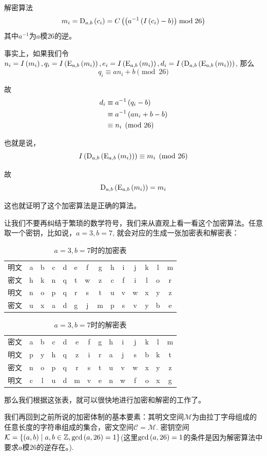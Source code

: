 解密算法
\[m_i={\mathrm{D}_{a, b}\left({c_i}\right)}=C\left( {\left( {a^{-1}\left( {I\left( {c_i}\right)-b}\right)}\right)\bmod{26}}\right)\]
其中$a^{-1}$为$a$模$26$的逆。\par
事实上，如果我们令$n_i=I\left( {m_i}\right), q_i=I\left( {{\mathrm{E}_{a, b}\left({m_i}\right)}}\right), e_i=I\left( {{\mathrm{E}_{a, b}\left({m_i}\right)}}\right), d_i=I\left( {{\mathrm{D}_{a, b}\left({{\mathrm{E}_{a, b}\left({m_i}\right)}}\right)}}\right)$, 那么
\[q_i\equiv an_i+b\pmod{26}\]

故
\begin{align*}
    d_i&\equiv a^{-1}\left( {q_i-b}\right)\\
    &\equiv a^{-1}\left( {an_i+b-b}\right)\\
    &\equiv n_i\pmod{26}
\end{align*}

也就是说，
\[I\left( {{\mathrm{D}_{a, b}\left({{\mathrm{E}_{a, b}\left({m_i}\right)}}\right)}}\right)\equiv m_i\pmod{26}\]

故
\[{\mathrm{D}_{a, b}\left({{\mathrm{E}_{a, b}\left({m_i}\right)}}\right)}=m_i\]

这也就证明了这个加密算法是正确的算法。\par
让我们不要再纠结于繁琐的数学符号，我们来从直观上看一看这个加密算法。任意取一个密钥，比如说，$a=3, b=7$, 就会对应的生成一张加密表和解密表：
\begin{table}[H]
    \centering
    \caption{$a=3, b=7$时的加密表}
    \begin{tabular}{c|c|c|c|c|c|c|c|c|c|c|c|c|c}\hline
        明文&a&b&c&d&e&f&g&h&i&j&k&l&m\\
        密文&h&k&n&q&t&w&z&c&f&i&l&o&r\\\hline
        明文&n&o&p&q&r&s&t&u&v&w&x&y&z\\
        密文&u&x&a&d&g&j&m&p&s&v&y&b&e\\\hline
    \end{tabular}
\end{table}
\begin{table}[H]
    \centering
    \caption{$a=3, b=7$时的解密表}
    \begin{tabular}{c|c|c|c|c|c|c|c|c|c|c|c|c|c}\hline
        密文&a&b&c&d&e&f&g&h&i&j&k&l&m\\
        明文&p&y&h&q&z&i&r&a&j&s&b&k&t\\\hline
        密文&n&o&p&q&r&s&t&u&v&w&x&y&z\\
        明文&c&l&u&d&m&v&e&n&w&f&o&x&g\\\hline
    \end{tabular}
\end{table}

那么我们根据这张表，就可以很快地进行加密和解密的工作了。\par
我们再回到之前所说的加密体制的基本要素：其明文空间$\mathcal{M}$为由拉丁字母组成的任意长度的字符串组成的集合，密文空间$\mathcal{C}=\mathcal{M}$. 密钥空间$\mathcal{K}=\left\{ {\left( {a, b}\right)\mid a, b\in \mathbb{Z}, \gcd\left( {a ,26}\right)=1} \right\}$(这里$\gcd\left( {a, 26}\right)=1$的条件是因为解密算法中要求$a$模$26$的逆存在。).
